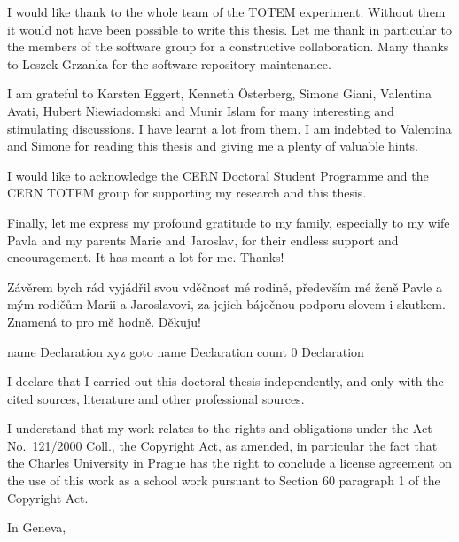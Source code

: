 I would like thank to the whole team of the TOTEM experiment. Without them it would not have been possible to write this thesis. Let me thank in particular to the members of the software group for a constructive collaboration. Many thanks to Leszek Grzanka for the software repository maintenance. 

I am grateful to Karsten Eggert, Kenneth \"Osterberg, Simone Giani, Valentina Avati, Hubert Niewiadomski and Munir Islam for many interesting and stimulating discussions. I have learnt a lot from them. I am indebted to Valentina and Simone for reading this thesis and giving me a plenty of valuable hints.

I would like to acknowledge the CERN Doctoral Student Programme and the CERN TOTEM group for supporting my research and this thesis.

Finally, let me express my profound gratitude to my family, especially to my wife Pavla and my parents Marie and Jaroslav, for their endless support and 
encouragement. It has meant a lot for me. Thanks!

\baselineskip

Závěrem bych rád vyjádřil svou vděčnost mé rodině, především mé ženě Pavle a mým rodičům Marii a Jaroslavovi, za jejich báječnou podporu slovem i skutkem. Znamená to pro mě hodně. Děkuju!


\egroup

\eject
\forceoddpage


\pdfdest name {Declaration} xyz
\pdfoutline goto name {Declaration} count 0 {Declaration}%

I declare that I carried out this doctoral thesis independently, and only with the cited sources, literature and other professional sources.

I understand that my work relates to the rights and obligations under the Act No.~121/2000 Coll., the Copyright Act, as amended, in particular the fact that the Charles University in Prague has the right to conclude a license agreement on the use of this work as a school work pursuant to Section 60 paragraph 1 of the Copyright Act.

\baselineskip

In Geneva, 

\baselineskip
{}

\vfil\eject
\forceoddpage

